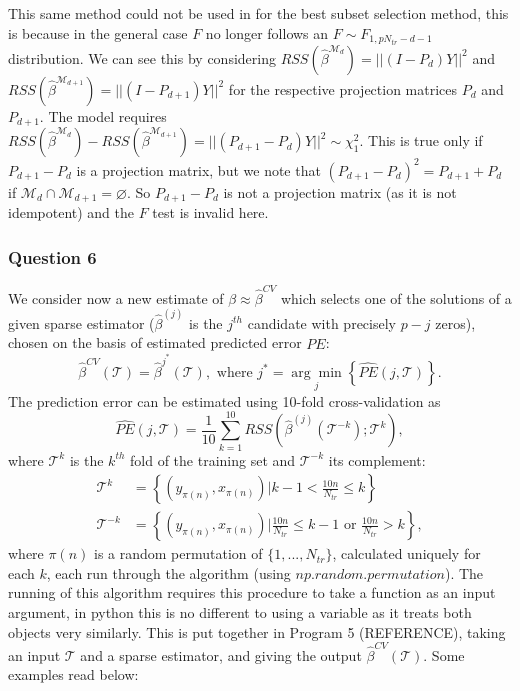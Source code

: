 \documentclass{article}
\begin{document}
This same method could not be used in for the best subset selection method, this is because in the general case $F$ no longer follows an $F \sim F_{1,p N_{tr}-d-1}$ distribution. We can see this by considering $RSS(\hat{\beta}^{\mathcal{M}_d}) = ||(I-P_d)Y||^2$ and $RSS(\hat{\beta}^{\mathcal{M}_{d+1}}) = ||(I-P_{d+1})Y||^2$ for the respective projection matrices $P_d$ and $P_{d+1}$. The model requires $RSS(\hat{\beta}^{\mathcal{M}_d}) - RSS(\hat{\beta}^{\mathcal{M}_{d+1}})=||(P_{d+1}-P_{d})Y||^2 \sim \chi ^2 _1$. This is true only if $P_{d+1}-P_{d}$ is a projection matrix, but we note that $(P_{d+1}-P_{d})^2 = P_{d+1} + P_{d}$ if $\mathcal{M}_d \cap \mathcal{M}_{d+1} = \varnothing$. So $P_{d+1}-P_{d}$ is not a projection matrix (as it is not idempotent) and the $F$ test is invalid here.

\subsubsection{Question 6}

We consider now a new estimate of $\beta \approx \hat{\beta}^{CV}$ which selects one of the solutions of a given sparse estimator ($\hat{\beta}^{(j)}$ is the $j^{th}$ candidate with precisely $p-j$ zeros), chosen on the basis of estimated predicted error $\hat{PE}$:
\begin{equation*}
\hat{\beta}^{CV}(\mathcal{T})=\hat{\beta}^{j^*}(\mathcal{T}), \text{ where } j^* = \underset{j}{\arg\min} \left\{ \hat{PE}(j,\mathcal{T}) \right \}.
\end{equation*} 
The prediction error can be estimated using 10-fold cross-validation as
\begin{equation*}
\hat{PE}(j,\mathcal{T}) = \frac{1}{10} \sum_{k=1}^{10} RSS \left ( \hat{\beta}^{(j)}(\mathcal{T}^{-k}); \mathcal{T}^k \right ),
\end{equation*}
where $\mathcal{T}^k$ is the $k^{th}$ fold of the training set and $\mathcal{T}^{-k}$ its complement:
\begin{equation*}
\begin{split}
\mathcal{T}^k &= \left \{ (y_{\pi(n)},x_{\pi(n)}) | k-1 < \frac{10n}{N_{tr}} \leq k \right \} \\
\mathcal{T}^{-k} &= \left \{ (y_{\pi(n)},x_{\pi(n)}) | \frac{10n}{N_{tr}} \leq k-1 \text{ or } \frac{10n}{N_{tr}} > k \right \},
\end{split}
\end{equation*}
where $\pi(n)$ is a random permutation of $\{1,...,N_{tr} \}$, calculated uniquely for each $k$, each run through the algorithm (using $\textit{np.random.permutation}$). The running of this algorithm requires this procedure to take a function as an input argument, in python this is no different to using a variable as it treats both objects very similarly. This is put together in Program 5 (REFERENCE), taking an input $\mathcal{T}$ and a sparse estimator, and giving the output $\hat{\beta}^{CV}(\mathcal{T})$. Some examples read below:
\end{document}
